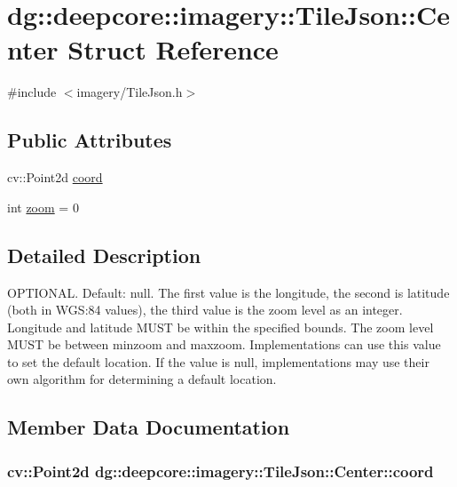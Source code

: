 \hypertarget{structdg_1_1deepcore_1_1imagery_1_1_tile_json_1_1_center}{}\section{dg\+:\+:deepcore\+:\+:imagery\+:\+:Tile\+Json\+:\+:Center Struct Reference}
\label{structdg_1_1deepcore_1_1imagery_1_1_tile_json_1_1_center}


{\ttfamily \#include $<$imagery/\+Tile\+Json.\+h$>$}

\subsection*{Public Attributes}
\begin{DoxyCompactItemize}
\item 
cv\+::\+Point2d \hyperlink{structdg_1_1deepcore_1_1imagery_1_1_tile_json_1_1_center_a3280457ff480662ddfeaf54cf78ecac5}{coord}
\item 
int \hyperlink{structdg_1_1deepcore_1_1imagery_1_1_tile_json_1_1_center_a81f1b2f35f3c6a6338eae7280b652a58}{zoom} = 0
\end{DoxyCompactItemize}


\subsection{Detailed Description}
O\+P\+T\+I\+O\+N\+AL. Default\+: null. The first value is the longitude, the second is latitude (both in W\+GS\+:84 values), the third value is the zoom level as an integer. Longitude and latitude M\+U\+ST be within the specified bounds. The zoom level M\+U\+ST be between minzoom and maxzoom. Implementations can use this value to set the default location. If the value is null, implementations may use their own algorithm for determining a default location. 

\subsection{Member Data Documentation}
\subsubsection[{\texorpdfstring{coord}{coord}}]{\setlength{\rightskip}{0pt plus 5cm}cv\+::\+Point2d dg\+::deepcore\+::imagery\+::\+Tile\+Json\+::\+Center\+::coord}\hypertarget{structdg_1_1deepcore_1_1imagery_1_1_tile_json_1_1_center_a3280457ff480662ddfeaf54cf78ecac5}{}\label{structdg_1_1deepcore_1_1imagery_1_1_tile_json_1_1_center_a3280457ff480662ddfeaf54cf78ecac5}
